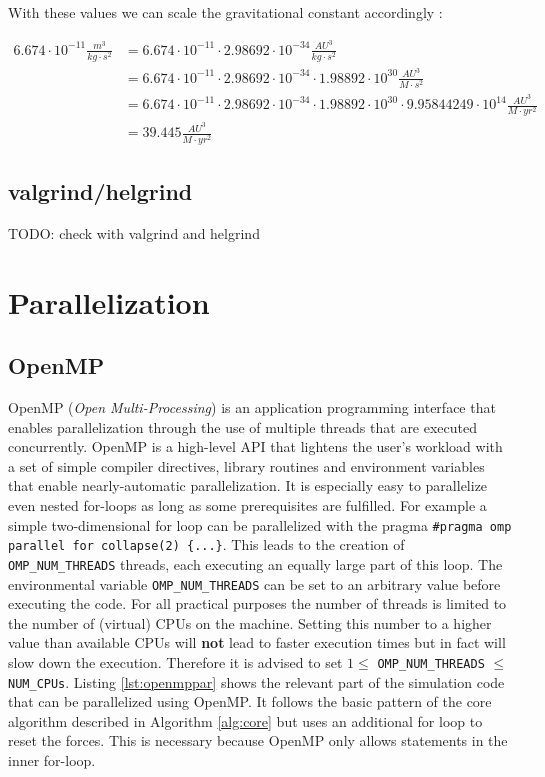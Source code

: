 \documentclass[a4paper,11pt]{scrartcl} %
\begin{document}
With these values we can scale the gravitational constant accordingly \cite{astrounits}:

\begin{align*}
	6.674 \cdot 10^{-11} \frac{m^3}{kg \cdot s^2}
	& =  6.674 \cdot 10^{-11} \cdot 2.98692\cdot 10^{-34} \frac{AU^3}{kg \cdot s^2}\\
	& = 6.674 \cdot 10^{-11} \cdot 2.98692\cdot 10^{-34} \cdot 1.98892 \cdot 10^{30} \frac{AU^3}{M \cdot s^2} \\
	& = 6.674 \cdot 10^{-11} \cdot 2.98692\cdot 10^{-34} \cdot 1.98892 \cdot 10^{30} \cdot 9.95844249\cdot 10^{14} \frac{AU^3}{M \cdot yr^2}\\
	& = 39.445 \frac{AU^3}{M \cdot yr^2}
\end{align*}

\subsection{valgrind/helgrind}
TODO: check with valgrind and helgrind

\section{Parallelization}
\subsection{OpenMP}
OpenMP (\textit{Open Multi-Processing}) is an application programming interface that enables parallelization through the use of multiple threads that are executed concurrently. OpenMP is a high-level API that lightens the user's workload with a set of simple compiler directives, library routines and environment variables that enable nearly-automatic parallelization. It is especially easy to parallelize even nested for-loops as long as some prerequisites are fulfilled. For example a simple two-dimensional for loop can be parallelized with the pragma \texttt{\#pragma omp parallel for collapse(2) \{...\}}. This leads to the creation of \texttt{OMP\_NUM\_THREADS} threads, each executing an equally large part of this loop. The environmental variable \texttt{OMP\_NUM\_THREADS} can be set to an arbitrary value before executing the code. For all practical purposes the number of threads is limited to the number of (virtual) CPUs on the machine. Setting this number to a higher value than available CPUs will \textbf{not} lead to faster execution times but in fact will slow down the execution. Therefore it is advised to set $1 \leq $ \texttt{OMP\_NUM\_THREADS} $\leq $ \texttt{NUM\_CPUs}. Listing \ref{lst:openmppar} shows the relevant part of the simulation code that can be parallelized using OpenMP. It follows the basic pattern of the core algorithm described in Algorithm \ref{alg:core} but uses an additional for loop to reset the forces. This is necessary because OpenMP only allows statements in the inner for-loop.\\
\end{document}
